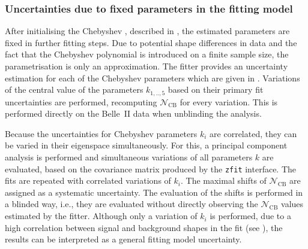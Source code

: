 \subsubsection{Uncertainties due to fixed parameters in the \texorpdfstring{\Mbc}{Mbc} fitting model}\label{sec:fitting_model_uncertainties}

After initialising the Chebyshev \PDF, described in , the estimated parameters are fixed in further fitting steps.
Due to potential shape differences in data and the fact that the Chebyshev polynomial is introduced on a finite sample size, the parametrisation is only an approximation.
The \Mbc fitter provides an uncertainty estimation for each of the Chebyshev \PDF parameters which are given in .
Variations of the central value of the parameters $k_{1,..,5}$ based on their primary fit uncertainties are performed, recomputing $\mathcal{N}_{\mathrm{CB}}$ for every variation.
This is performed directly on the Belle~II data when unblinding the analysis.

Because the uncertainties for Chebyshev parameters $k_i$ are correlated, they can be varied in their eigenspace simultaneously.
For this, a principal component analysis is performed and simultaneous variations of all parameters $k$ are evaluated, based on the covariance matrix produced by the \texttt{zfit} interface.
The \Mbc fits are repeated with correlated variations of $k_i$. 
The maximal shifts of $\mathcal{N}_{\mathrm{CB}}$ are assigned as a systematic uncertainty.
The evaluation of the shifts is performed in a blinded way, i.e., they are evaluated without directly observing the $\mathcal{N}_{\mathrm{CB}}$ values estimated by the fitter.
Although only a variation of $k_i$ is performed, 
due to a high correlation between signal and background \PDF shapes in the fit (see ),
the results can be interpreted as a general fitting model uncertainty.

